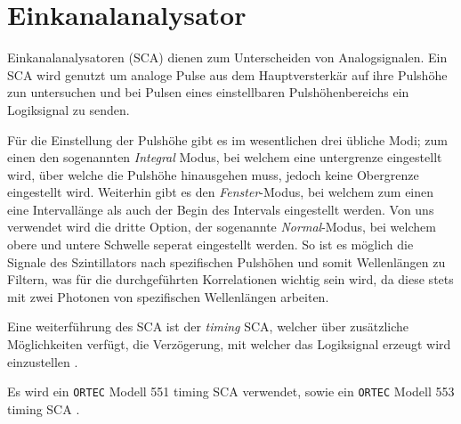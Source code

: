 \section{Einkanalanalysator}
Einkanalanalysatoren (SCA) dienen zum Unterscheiden von Analogsignalen. Ein SCA wird genutzt um analoge Pulse aus dem Hauptversterkär auf ihre Pulshöhe zun untersuchen und bei Pulsen eines einstellbaren Pulshöhenbereichs ein Logiksignal zu senden.

Für die Einstellung der Pulshöhe gibt es im wesentlichen drei übliche Modi; zum einen den sogenannten \textit{Integral} Modus, bei welchem eine untergrenze eingestellt wird, über welche die Pulshöhe hinausgehen muss, jedoch keine Obergrenze eingestellt wird. Weiterhin gibt es den \textit{Fenster}-Modus, bei welchem zum einen eine Intervallänge als auch der Begin des Intervals eingestellt werden. Von uns verwendet wird die dritte Option, der sogenannte \textit{Normal}-Modus, bei welchem obere und untere Schwelle seperat eingestellt werden\cite[287-288]{leotechniques}. So ist es möglich die Signale des Szintillators nach spezifischen Pulshöhen und somit Wellenlängen zu Filtern, was für die durchgeführten Korrelationen wichtig sein wird, da diese stets mit zwei Photonen von spezifischen Wellenlängen arbeiten.

Eine weiterführung des SCA ist der \textit{timing} SCA, welcher über zusätzliche Möglichkeiten verfügt, die Verzögerung, mit welcher das Logiksignal erzeugt wird einzustellen \cite[289]{leotechniques}.

Es wird ein \texttt{ORTEC} Modell 551 timing SCA verwendet, sowie ein \texttt{ORTEC} Modell 553 timing SCA \cite{sca551}.

